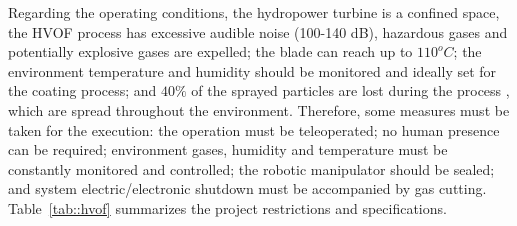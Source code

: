 

Regarding the operating conditions, the hydropower turbine is a confined
space, the HVOF process has excessive audible noise (100-140 dB), hazardous
gases and potentially explosive gases are expelled; the blade can reach up to
$110^oC$; the environment temperature and humidity should be monitored and
ideally set for the coating process; and $40\%$ of the sprayed particles are
lost during the process \citep{wu2006rebound}, which are spread throughout
the environment. Therefore, some measures must be taken for the execution: the
operation must be teleoperated; no human presence can be required; environment
gases, humidity and temperature must be constantly monitored and controlled; the
robotic manipulator should be sealed; %
and system electric/electronic shutdown must be accompanied by gas cutting. Table~\ref{tab::hvof} summarizes the project restrictions and
specifications.


